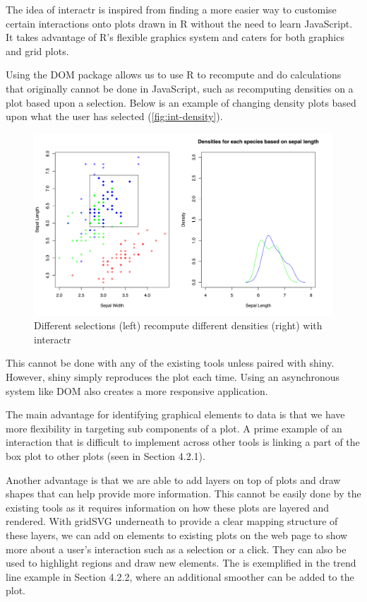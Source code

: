 \documentclass[11pt,]{report}
\begin{document}
The idea of \textsf{interactr} is inspired from finding a more easier
way to customise certain interactions onto plots drawn in R without the
need to learn JavaScript. It takes advantage of R's flexible graphics
system and caters for both \textsf{graphics} and \textsf{grid} plots.

Using the \textsf{DOM} package allows us to use R to recompute and do
calculations that originally cannot be done in JavaScript, such as
recomputing densities on a plot based upon a selection. Below is an
example of changing density plots based upon what the user has selected
(\autoref{fig:int-density}).

\begin{figure}[H]

{\centering \includegraphics[width=18.22in,]{./fig/int-density-example} 

}

\caption{\label{fig:int-density} Different selections (left) recompute different densities (right) with interactr}\label{fig:unnamed-chunk-89}
\end{figure}

This cannot be done with any of the existing tools unless paired with
\textsf{shiny}. However, shiny simply reproduces the plot each time.
Using an asynchronous system like \textsf{DOM} also creates a more
responsive application.

The main advantage for identifying graphical elements to data is that we
have more flexibility in targeting sub components of a plot. A prime
example of an interaction that is difficult to implement across other
tools is linking a part of the box plot to other plots (seen in Section
4.2.1).

Another advantage is that we are able to add layers on top of plots and
draw shapes that can help provide more information. This cannot be
easily done by the existing tools as it requires information on how
these plots are layered and rendered. With \textsf{gridSVG} underneath
to provide a clear mapping structure of these layers, we can add on
elements to existing plots on the web page to show more about a user's
interaction such as a selection or a click. They can also be used to
highlight regions and draw new elements. The is exemplified in the trend
line example in Section 4.2.2, where an additional smoother can be added
to the plot.
\end{document}

